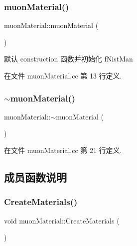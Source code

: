\subsubsection{\texorpdfstring{muon\+Material()}{muonMaterial()}}
{\footnotesize\ttfamily muon\+Material\+::muon\+Material (\begin{DoxyParamCaption}{ }\end{DoxyParamCaption})}



默认 construction 函数并初始化 f\+Nist\+Man 



在文件 muon\+Material.\+cc 第 13 行定义.

\mbox{\label{classmuonMaterial_a4f043be3ac0578d37c1c2cd801b9a1d8}} 
\subsubsection{\texorpdfstring{$\sim$muon\+Material()}{~muonMaterial()}}
{\footnotesize\ttfamily muon\+Material\+::$\sim$muon\+Material (\begin{DoxyParamCaption}{ }\end{DoxyParamCaption})}



在文件 muon\+Material.\+cc 第 21 行定义.



\subsection{成员函数说明}
\mbox{\label{classmuonMaterial_a8a540dd90dc8252913e5dcb63d7f07b0}} 
\subsubsection{\texorpdfstring{Create\+Materials()}{CreateMaterials()}}
{\footnotesize\ttfamily void muon\+Material\+::\+Create\+Materials (\begin{DoxyParamCaption}{ }\end{DoxyParamCaption})\hspace{0.3cm}{\ttfamily [private]}}



